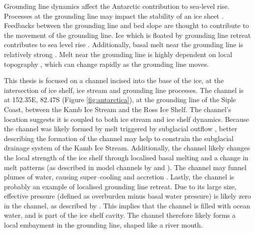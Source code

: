 Grounding line dynamics affect the Antarctic contribution to sea-level rise.  Processes at the grounding line may impact the stability of an ice sheet \citep{weertman1974stability}. Feedbacks between the grounding line and bed slope are thought to contribute to the movement of the grounding line. Ice which is floated by grounding line retreat contributes to sea level rise \citep{dowdeswell2020delicate,dupont2005assessment}. Additionally, basal melt near the grounding line is relatively strong \citep{rignot2013ice,goldberg2019accurately}. Melt near the grounding line is highly dependent on local topography \citep{rignot2013ice,goldberg2019accurately}, which can change rapidly as the grounding line moves.

This thesis is focused on a channel incised into the base of the ice, at the intersection of ice shelf, ice stream and grounding line processes. The channel is at 152.35\textdegree E, 82.47\textdegree  S (Figure \ref{fig:antarctica}), at the grounding line of the Siple Coast, between the Kamb Ice Stream and the Ross Ice Shelf. The channel's location suggests it is coupled to both ice stream and ice shelf dynamics.
Because the channel was likely formed by melt triggered by subglacial outflow \citep{kim2016active,alley2016impacts}, better describing the formation of the channel may help to constrain the subglacial drainage system of the Kamb Ice Stream. 
Additionally, the channel likely changes the local strength of the ice shelf through localised basal melting and a change in melt patterns (as described in model channels by \cite{gladish2012ice} and \cite{sergienko2013basal}). The channel may funnel plumes of water, causing super--cooling and accretion \citep{holland2006effects}.
Lastly, the channel is probably an example of localised grounding line retreat. Due to its large size, effective pressure (defined as overburden
minus basal water pressure) is likely zero in the channel, as described by \cite{drews2015evolution}. This implies that the channel is filled with ocean water, and is part of the ice shelf cavity. The channel therefore likely forms a local embayment in the grounding line, shaped like a river mouth.


